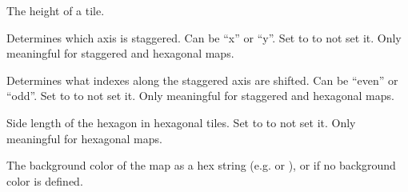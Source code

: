 \documentclass[letterpaper,10pt,english]{sphinxmanual}
\begin{document}
\begin{fulllineitems}
\begin{fulllineitems}
\end{fulllineitems}


\begin{fulllineitems}
\label{index:tmx.TileMap.tileheight}
The height of a tile.

\end{fulllineitems}


\begin{fulllineitems}
\label{index:tmx.TileMap.staggeraxis}
Determines which axis is staggered.  Can be ``x'' or ``y''.  Set to
 to not set it.  Only meaningful for staggered and
hexagonal maps.

\end{fulllineitems}


\begin{fulllineitems}
\label{index:tmx.TileMap.staggerindex}
Determines what indexes along the staggered axis are shifted.
Can be ``even'' or ``odd''.  Set to  to not set it.
Only meaningful for staggered and hexagonal maps.

\end{fulllineitems}


\begin{fulllineitems}
\label{index:tmx.TileMap.hexsidelength}
Side length of the hexagon in hexagonal tiles.  Set to
 to not set it.  Only meaningful for hexagonal maps.

\end{fulllineitems}


\begin{fulllineitems}
\label{index:tmx.TileMap.backgroundcolor}
The background color of the map as a hex string (e.g.
 or ), or  if no background
color is defined.

\end{fulllineitems}



\end{fulllineitems}
\end{document}
